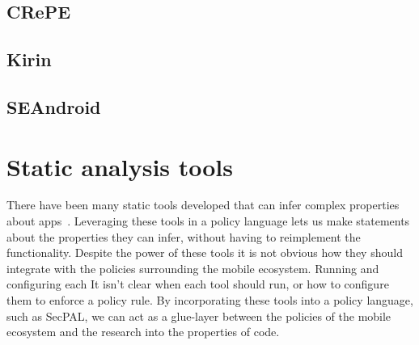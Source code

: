 \documentclass[thesis.tex]{subfiles}
\begin{document}
\subsection{CRePE}
\subsection{Kirin}
\subsection{SEAndroid}

\section{Static analysis tools}

There have been many static tools developed that can infer complex
properties about
apps~\cite{felt_android_2011,song_integrated_2016,antonin_carette_investigating_2017,schmidt_static_2009,enck_taintdroid:_2014}.
Leveraging these tools in a policy language lets us make statements about the
properties they can infer, without having to reimplement the functionality.
Despite the power of these tools it is not obvious how they should integrate
with the policies surrounding the mobile ecosystem. Running and configuring each
It isn't clear when each tool should run, or how to configure them to enforce a
policy rule. By incorporating these tools into a policy language, such as
SecPAL, we can act as a glue-layer between the policies of the mobile ecosystem
and the research into the properties of code.
\end{document}

